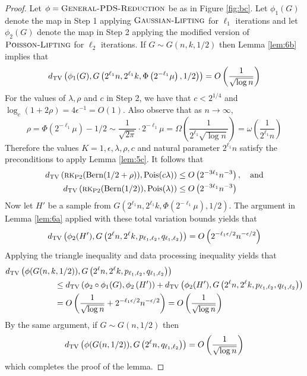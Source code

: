 \begin{proof}
Let $\phi = \textsc{General-PDS-Reduction}$ be as in Figure \ref{fig:bc}. Let $\phi_1(G)$ denote the map in Step 1 applying $\textsc{Gaussian-Lifting}$ for $\ell_1$ iterations and let $\phi_2(G)$ denote the map in Step 2 applying the modified version of $\textsc{Poisson-Lifting}$ for $\ell_2$ iterations. If $G \sim G(n, k, 1/2)$ then Lemma \ref{lem:6b} implies that
$$d_{\text{TV}}\left( \phi_1(G), G\left(2^{\ell_1} n, 2^{\ell_1} k, \Phi\left( 2^{-\ell_1} \mu \right), 1/2 \right) \right) = O\left(\frac{1}{\sqrt{\log n}} \right)$$
For the values of $\lambda, \rho$ and $c$ in Step 2, we have that $c < 2^{1/4}$ and $\log_c (1 + 2\rho) = 4\epsilon^{-1} = O(1)$. Also observe that as $n \to \infty$,
$$\rho = \Phi\left(2^{-\ell_1} \mu\right) - 1/2 \sim \frac{1}{\sqrt{2\pi}} \cdot 2^{-\ell_1} \mu = \Omega \left( \frac{1}{2^{\ell_1} \sqrt{\log n}} \right) = \omega \left( \frac{1}{2^{\ell_1} n} \right)$$
Therefore the values $K = 1, \epsilon, \lambda, \rho, c$ and natural parameter $2^{\ell_1} n$ satisfy the preconditions to apply Lemma \ref{lem:5c}. It follows that
\begin{align*}
d_{\text{TV}}\left(\textsc{rk}_{\text{P2}}(\text{Bern}(1/2 + \rho)), \text{Pois}(c\lambda) \right) &\le O\left(2^{-3\ell_1}n^{-3}\right), \quad \text{and} \\
d_{\text{TV}}\left(\textsc{rk}_{\text{P2}}(\text{Bern}(1/2)), \text{Pois}(\lambda) \right) &\le O\left(2^{-3\ell_1}n^{-3}\right)
\end{align*}
Now let $H'$ be a sample from $G\left(2^{\ell_1} n, 2^{\ell_1} k, \Phi\left( 2^{-\ell_1} \mu \right), 1/2 \right)$. The argument in Lemma \ref{lem:6a} applied with these total variation bounds yields that
$$d_{\text{TV}}\left( \phi_2(H'), G\left(2^\ell n, 2^\ell k, p_{\ell_1, \ell_2}, q_{\ell_1, \ell_2} \right) \right) = O\left(2^{-\ell_1 \epsilon/2} n^{-\epsilon/2} \right)$$
Applying the triangle inequality and data processing inequality yields that
\begin{align*}
&d_{\text{TV}}\left( \phi(G(n, k, 1/2)), G\left(2^\ell n, 2^\ell k, p_{\ell_1, \ell_2}, q_{\ell_1, \ell_2} \right) \right) \\
&\quad \quad \quad \quad \quad \quad \le d_{\text{TV}}\left( \phi_2 \circ \phi_1(G), \phi_2\left( H' \right) \right) + d_{\text{TV}}\left( \phi_2(H'), G\left(2^\ell n, 2^\ell k, p_{\ell_1, \ell_2}, q_{\ell_1, \ell_2} \right) \right) \\
&\quad \quad \quad \quad \quad \quad = O\left(\frac{1}{\sqrt{\log n}} + 2^{-\ell_1 \epsilon/2} n^{-\epsilon/2} \right) = O\left( \frac{1}{\sqrt{\log n}} \right)
\end{align*}
By the same argument, if $G \sim G(n, 1/2)$ then
$$d_{\text{TV}}\left( \phi(G(n, 1/2)), G\left(2^\ell n, q_{\ell_1, \ell_2} \right) \right) = O\left( \frac{1}{\sqrt{\log n}} \right)$$
which completes the proof of the lemma.
\end{proof}

